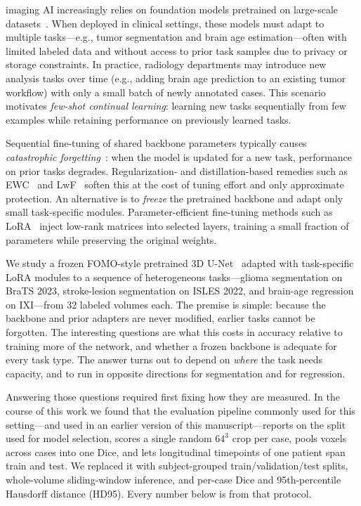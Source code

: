 \documentclass[journal,twoside,web]{ieeecolor}
\begin{document}
 imaging AI increasingly relies on foundation models pretrained on large-scale datasets~\cite{fomo2025,baseline}. \label{sec:intro}
When deployed in clinical settings, these models must adapt to multiple tasks---e.g., tumor segmentation and brain age estimation---often with limited labeled data and without access to prior task samples due to privacy or storage constraints. In practice, radiology departments may introduce new analysis tasks over time (e.g., adding brain age prediction to an existing tumor workflow) with only a small batch of newly annotated cases. This scenario motivates \emph{few-shot continual learning}: learning new tasks sequentially from few examples while retaining performance on previously learned tasks.

Sequential fine-tuning of shared backbone parameters typically causes \emph{catastrophic forgetting}~\cite{kirkpatrick2017,mccloskey1989catastrophic}: when the model is updated for a new task, performance on prior tasks degrades. Regularization- and distillation-based remedies such as EWC~\cite{kirkpatrick2017} and LwF~\cite{li2017lwf} soften this at the cost of tuning effort and only approximate protection. An alternative is to \emph{freeze} the pretrained backbone and adapt only small task-specific modules. Parameter-efficient fine-tuning methods such as LoRA~\cite{hu2022lora, hu2024computational} inject low-rank matrices into selected layers, training a small fraction of parameters while preserving the original weights.

We study a frozen FOMO-style pretrained 3D U-Net~\cite{fomo2025} adapted with task-specific LoRA modules to a sequence of heterogeneous tasks---glioma segmentation on BraTS 2023, stroke-lesion segmentation on ISLES 2022, and brain-age regression on IXI---from 32 labeled volumes each. The premise is simple: because the backbone and prior adapters are never modified, earlier tasks cannot be forgotten. The interesting questions are what this costs in accuracy relative to training more of the network, and whether a frozen backbone is adequate for every task type. The answer turns out to depend on \emph{where} the task needs capacity, and to run in opposite directions for segmentation and for regression.

Answering those questions required first fixing how they are measured. In the course of this work we found that the evaluation pipeline commonly used for this setting---and used in an earlier version of this manuscript---reports on the split used for model selection, scores a single random $64^3$ crop per case, pools voxels across cases into one Dice, and lets longitudinal timepoints of one patient span train and test. We replaced it with subject-grouped train/validation/test splits, whole-volume sliding-window inference, and per-case Dice and 95th-percentile Hausdorff distance (HD95). Every number below is from that protocol.
\end{document}
